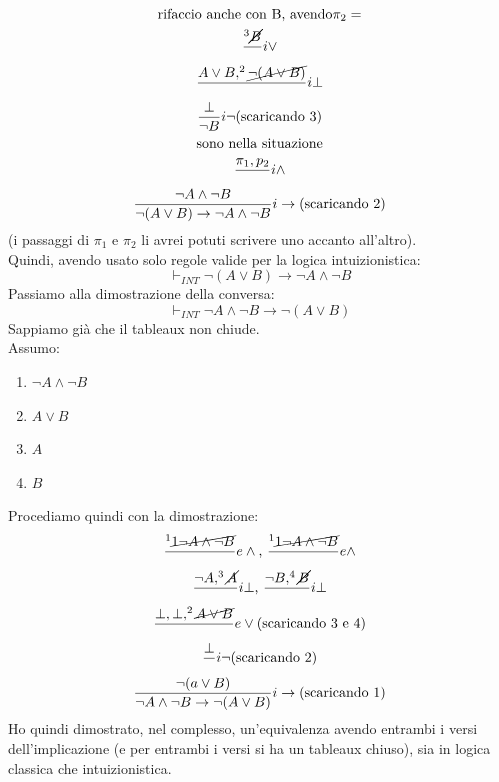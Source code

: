 \documentclass[a4paper,12pt, oneside]{book}
\begin{document}
\begin{esempio}
\begin{gather*}
    \mbox{rifaccio anche con B, avendo} \pi_2=\\
    \frac{ ^3\cancel{B}}{}i\lor\\
    \frac{A\lor B, ^2\cancel{\neg(A\lor B)}}{}i\bot\\
    \frac{\bot}{\neg B}i\neg\mbox{(scaricando 3)}\\
    \mbox{sono nella situazione}\\
    \frac{\pi_1, p_2}{}i\land\\
    \frac{\neg A \land \neg B}{\neg(A\lor B)\to \neg A\land \neg
      B}i\to\mbox{(scaricando 2)}  
  \end{gather*}
  (i passaggi di $\pi_1$ e $\pi_2$ li avrei potuti scrivere uno accanto
  all'altro). \\
  Quindi, avendo usato solo regole valide per la logica intuizionistica:
  \[\vdash_{INT}\neg(A\lor B)\to \neg A\land \neg B\]
  Passiamo alla dimostrazione della conversa:
 \[\vdash_{INT}\neg A\land \neg B\to\neg(A\lor B)\]
 Sappiamo già che il tableaux non chiude.\\
 Assumo:
 \begin{enumerate}
   \item $\neg A\land \neg B$
   \item $A\lor B$
   \item $A$
   \item $B$
 \end{enumerate}
 Procediamo quindi con la dimostrazione:
 \begin{gather*}
   \frac{^1\cancel{1\neg A\land \neg B}}{}e\land\mbox{, }\frac{^1\cancel{1\neg
         A\land \neg B}}{}e\land\\ 
   \frac{\neg A, ^3 \cancel{A}}{}i\bot\mbox{, }\frac{\neg B,
     ^4\cancel{B}}{}i\bot\\  
   \frac{\bot,\bot,^2\cancel{A\lor B}}{}e\lor\mbox{(scaricando 3 e 4)}\\
   \frac{\bot}{}i\neg\mbox{(scaricando 2)}\\
   \frac{\neg(a\lor B)}{\neg A\land \neg B\to\neg(A\lor B)}i\to\mbox{(scaricando
     1)} 
 \end{gather*}
 Ho quindi dimostrato, nel complesso, un'equivalenza avendo entrambi i versi
 dell'implicazione (e per entrambi i versi si ha un tableaux chiuso), sia in
 logica classica che intuizionistica.  
\end{esempio}
\end{document}
